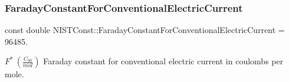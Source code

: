 \subsubsection{\texorpdfstring{Faraday\+Constant\+For\+Conventional\+Electric\+Current}{FaradayConstantForConventionalElectricCurrent}}
{\footnotesize\ttfamily const double N\+I\+S\+T\+Const\+::\+Faraday\+Constant\+For\+Conventional\+Electric\+Current = 96485.}

$F^\ast \ (\frac{C_{90}}{mol})$ Faraday constant for conventional electric current in coulombs per mole. 